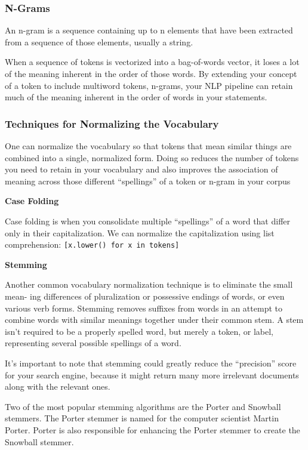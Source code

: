 \documentclass[
]{book}
\begin{document}
\hypertarget{n-grams}{%
\subsubsection{N-Grams}\label{n-grams}}

An n-gram is a sequence containing up to n elements that have been extracted from a sequence of those elements, usually a string.

When a sequence of tokens is vectorized into a bag-of-words vector, it loses a lot of the meaning inherent in the order of those words. By extending your concept of a token to include multiword tokens, n-grams, your NLP pipeline can retain much of the meaning inherent in the order of words in your statements.

\hypertarget{techniques-for-normalizing-the-vocabulary}{%
\subsubsection{Techniques for Normalizing the Vocabulary}\label{techniques-for-normalizing-the-vocabulary}}

One can normalize the vocabulary so that tokens that mean similar things are combined into a single, normalized form. Doing so reduces the number of tokens you need to retain in your vocabulary and also improves the association of meaning across those different ``spellings'' of a token or n-gram in your corpus

\textbf{Case Folding}

Case folding is when you consolidate multiple ``spellings'' of a word that differ only in their capitalization. We can normalize the capitalization using list comprehension: \texttt{{[}x.lower()\ for\ x\ in\ tokens{]}}

\textbf{Stemming}

Another common vocabulary normalization technique is to eliminate the small mean- ing differences of pluralization or possessive endings of words, or even various verb forms. Stemming removes suffixes from words in an attempt to combine words with similar meanings together under their common stem. A stem isn't required to be a properly spelled word, but merely a token, or label, representing several possible spellings of a word.

It's important to note that stemming could greatly reduce the ``precision'' score for your search engine,
because it might return many more irrelevant documents along with the relevant ones.

Two of the most popular stemming algorithms are the Porter and Snowball stemmers. The Porter stemmer is named for the computer scientist Martin Porter. Porter is also responsible for enhancing the Porter stemmer to create the Snowball stemmer.
\end{document}
